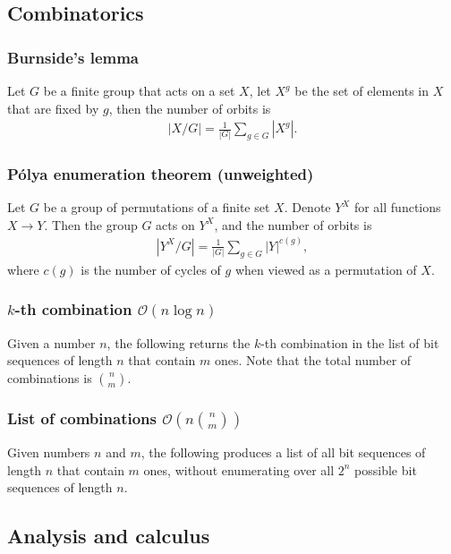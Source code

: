 \subsection{Combinatorics}

\subsubsection{Burnside's lemma}
Let $G$ be a finite group that acts on a set $X$, let $X^g$ be the set of elements in $X$ that are fixed by $g$, then the number of orbits is
\begin{align*}
    |X / G| = \frac1{|G|}\sum_{g \in G} |X^g|.
\end{align*}

\subsubsection{Pólya enumeration theorem (unweighted)}
Let $G$ be a group of permutations of a finite set $X$. Denote $Y^X$ for all functions $X \to Y$. Then the group $G$ acts on $Y^X$, and the number of orbits is
\begin{align*}
    |Y^X / G| = \frac1{|G|}\sum_{g \in G} |Y|^{c(g)},
\end{align*}
where $c(g)$ is the number of cycles of $g$ when viewed as a permutation of $X$.

\subsubsection{$k$-th combination $\mathcal O(n\log n)$}
Given a number $n$, the following returns the $k$-th combination in the list of bit sequences of length $n$ that contain $m$ ones. Note that the total number of combinations is $\binom nm$.

\subsubsection{List of combinations $\mathcal O(n\binom nm)$}
Given numbers $n$ and $m$, the following produces a list of all bit sequences of length $n$ that contain $m$ ones, without enumerating over all $2^n$ possible bit sequences of length $n$.



\subsection{Analysis and calculus}

